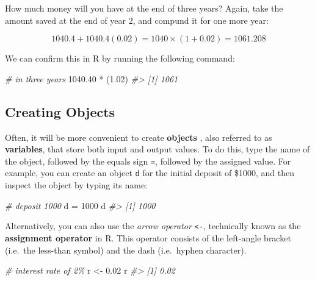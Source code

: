 \documentclass[
]{book}
\newenvironment{Shaded}{\begin{snugshade}}{\end{snugshade}}
\newcommand{\CommentTok}[1]{\textcolor[rgb]{0.56,0.35,0.01}{\textit{#1}}}
\newcommand{\DecValTok}[1]{\textcolor[rgb]{0.00,0.00,0.81}{#1}}
\newcommand{\FloatTok}[1]{\textcolor[rgb]{0.00,0.00,0.81}{#1}}
\newcommand{\NormalTok}[1]{#1}
\newcommand{\OtherTok}[1]{\textcolor[rgb]{0.56,0.35,0.01}{#1}}
\newcommand{\SpecialCharTok}[1]{\textcolor[rgb]{0.00,0.00,0.00}{#1}}
\begin{document}
How much money will you have at the end of three years? Again, take the amount
saved at the end of year 2, and compund it for one more year:

\[
1040.4 + 1040.4 (0.02) = 1040 \times (1 + 0.02) = 1061.208
\]

We can confirm this in R by running the following command:

\begin{Shaded}
\begin{Highlighting}[]
\CommentTok{\# in three years}
\FloatTok{1040.40} \SpecialCharTok{*}\NormalTok{ (}\FloatTok{1.02}\NormalTok{)}
\CommentTok{\#\textgreater{} [1] 1061}
\end{Highlighting}
\end{Shaded}

\hypertarget{creating-objects}{%
\subsection{Creating Objects}\label{creating-objects}}

Often, it will be more convenient to create \textbf{objects} , also referred to as \textbf{variables}, that store both input and output values. To do this, type the
name of the object, followed by the equals sign \texttt{=}, followed by the assigned
value. For example, you can create an object \texttt{d} for the initial deposit of
\$1000, and then inspect the object by typing its name:

\begin{Shaded}
\begin{Highlighting}[]
\CommentTok{\# deposit 1000}
\NormalTok{d }\OtherTok{=} \DecValTok{1000}
\NormalTok{d}
\CommentTok{\#\textgreater{} [1] 1000}
\end{Highlighting}
\end{Shaded}

Alternatively, you can also use the \emph{arrow operator} \texttt{\textless{}-}, technically known as
the \textbf{assignment operator} in R. This operator consists of the left-angle
bracket (i.e.~the less-than symbol) and the dash (i.e.~hyphen character).

\begin{Shaded}
\begin{Highlighting}[]
\CommentTok{\# interest rate of 2\%}
\NormalTok{r }\OtherTok{\textless{}{-}} \FloatTok{0.02}
\NormalTok{r}
\CommentTok{\#\textgreater{} [1] 0.02}
\end{Highlighting}
\end{Shaded}
\end{document}

